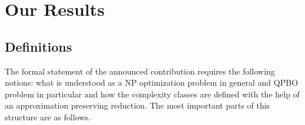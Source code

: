 \section{Our Results}\label{sec:results}

\subsection{Definitions}
The formal statement of the announced contribution requires the following notions: what is understood as a NP optimization problem in general and QPBO problem in particular and how the complexity classes are defined with the help of an approximation preserving reduction. The most important parts of this structure are as follows.


